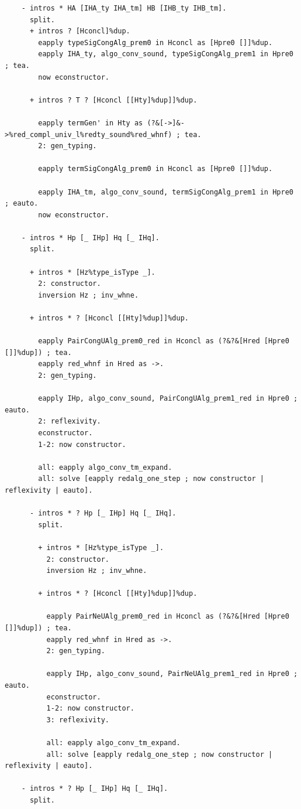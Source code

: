 \documentclass[10pt,a4paper]{amsart}
\begin{document}
\begin{lstlisting}
    - intros * HA [IHA_ty IHA_tm] HB [IHB_ty IHB_tm].
      split.
      + intros ? [Hconcl]%dup.
        eapply typeSigCongAlg_prem0 in Hconcl as [Hpre0 []]%dup.
        eapply IHA_ty, algo_conv_sound, typeSigCongAlg_prem1 in Hpre0 ; tea.
        now econstructor.

      + intros ? T ? [Hconcl [[Hty]%dup]]%dup.

        eapply termGen' in Hty as (?&[->]&->%red_compl_univ_l%redty_sound%red_whnf) ; tea.
        2: gen_typing.

        eapply termSigCongAlg_prem0 in Hconcl as [Hpre0 []]%dup.

        eapply IHA_tm, algo_conv_sound, termSigCongAlg_prem1 in Hpre0 ; eauto.
        now econstructor.

    - intros * Hp [_ IHp] Hq [_ IHq].
      split.

      + intros * [Hz%type_isType _].
        2: constructor.
        inversion Hz ; inv_whne.

      + intros * ? [Hconcl [[Hty]%dup]]%dup.

        eapply PairCongUAlg_prem0_red in Hconcl as (?&?&[Hred [Hpre0 []]%dup]) ; tea.
        eapply red_whnf in Hred as ->.
        2: gen_typing.

        eapply IHp, algo_conv_sound, PairCongUAlg_prem1_red in Hpre0 ; eauto.
        2: reflexivity.
        econstructor.
        1-2: now constructor.

        all: eapply algo_conv_tm_expand.
        all: solve [eapply redalg_one_step ; now constructor | reflexivity | eauto].

      - intros * ? Hp [_ IHp] Hq [_ IHq].
        split.
  
        + intros * [Hz%type_isType _].
          2: constructor.
          inversion Hz ; inv_whne.
  
        + intros * ? [Hconcl [[Hty]%dup]]%dup.
  
          eapply PairNeUAlg_prem0_red in Hconcl as (?&?&[Hred [Hpre0 []]%dup]) ; tea.
          eapply red_whnf in Hred as ->.
          2: gen_typing.
  
          eapply IHp, algo_conv_sound, PairNeUAlg_prem1_red in Hpre0 ; eauto.
          econstructor.
          1-2: now constructor.
          3: reflexivity.
  
          all: eapply algo_conv_tm_expand.
          all: solve [eapply redalg_one_step ; now constructor | reflexivity | eauto].

    - intros * ? Hp [_ IHp] Hq [_ IHq].
      split.


\end{lstlisting}
\end{document}
